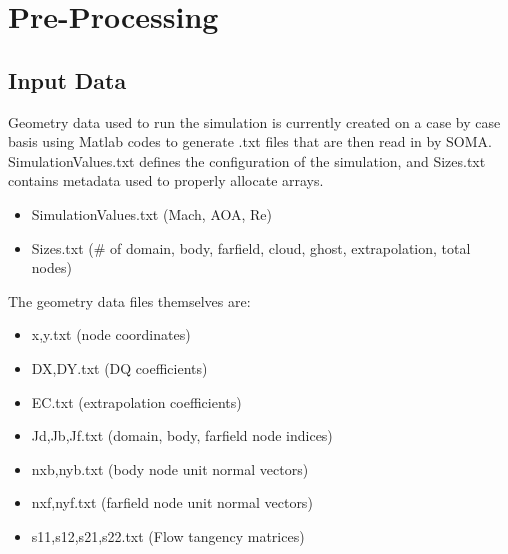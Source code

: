 \documentclass[12pt]{article}
\begin{document}
    \section{Pre-Processing}
    \subsection{Input Data}
        Geometry data used to run the simulation is currently created on a case by case basis using Matlab codes to generate .txt files that are then read in by SOMA. SimulationValues.txt defines the configuration of the simulation, and Sizes.txt contains metadata used to properly allocate arrays.
        \begin{itemize}
            \item SimulationValues.txt (Mach, AOA, Re)
            \item Sizes.txt (\# of domain, body, farfield, cloud, ghost, extrapolation, total nodes)
        \end{itemize}
        The geometry data files themselves are:
        \begin{itemize}
            \item x,y.txt (node coordinates)
            \item DX,DY.txt (DQ coefficients)
            \item EC.txt (extrapolation coefficients)
            \item Jd,Jb,Jf.txt (domain, body, farfield node indices)
            \item nxb,nyb.txt (body node unit normal vectors)
            \item nxf,nyf.txt (farfield node unit normal vectors)
            \item s11,s12,s21,s22.txt (Flow tangency matrices)
        \end{itemize}
\end{document}
